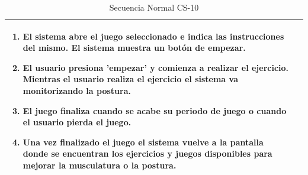 \begin{table}[h!]
\begin{tabular}{ |m{4cm}|m{11cm}|  }
\begin{enumerate}
                \item El sistema abre el juego seleccionado e indica las instrucciones del mismo. El sistema muestra un botón de empezar.
                \item El usuario presiona 'empezar' y comienza a realizar el ejercicio. Mientras el usuario realiza el ejercicio el sistema va monitorizando la postura.
			\item El juego finaliza cuando se acabe su periodo de juego o cuando el usuario pierda el juego. 
                \item Una vez finalizado el juego el sistema vuelve a la pantalla donde se encuentran los ejercicios y juegos disponibles para mejorar la musculatura o la postura. 
		\end{enumerate}\\
\hline

\end{tabular}
\caption{Secuencia Normal CS-10}
\label{SecNormalCS10}
\end{table}

